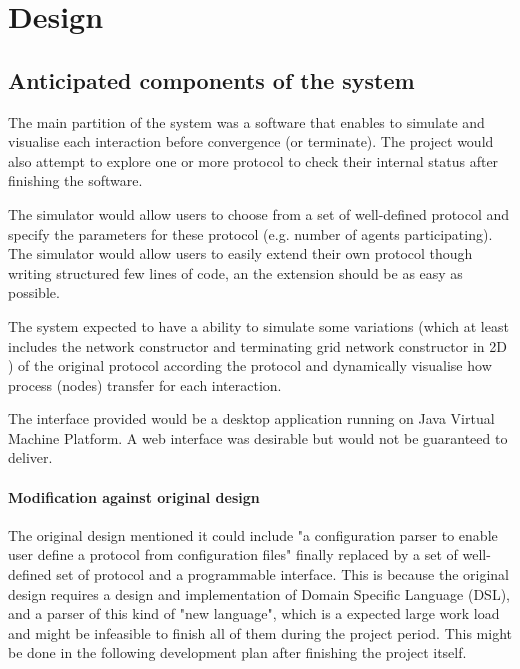 \section{Design} \label{design}
\subsection{Anticipated components of the system}
\par\noindent
The main partition of the system was a software that enables to simulate
and visualise each interaction before convergence (or terminate). The project
would also attempt to explore one or more protocol to check their internal
status after finishing the software.

\par\noindent
The simulator would allow users to choose from a set of well-defined protocol and
specify the parameters for these protocol (e.g. number of agents participating).
The simulator would allow users to easily extend their own protocol though writing
structured few lines of code, an the extension should be as easy as possible.

\par\noindent
The system expected to have a ability to simulate some variations (which at
least includes the network constructor \cite{MS16a} and terminating grid network constructor in 2D \cite{Mi17})
of the original protocol according the protocol and dynamically visualise how process (nodes) transfer for each interaction.

\par\noindent
The interface provided would be a desktop application running on Java Virtual Machine Platform.
A web interface was desirable but would not be guaranteed to deliver.

\paragraph{Modification against original design} The original design mentioned it could include "a configuration parser to
  enable user define a protocol from configuration files" finally replaced by a set of
  well-defined set of protocol and a programmable interface. This is because the
  original design requires a design and implementation of Domain Specific Language (DSL),
  and a parser of this kind of "new language", which is a expected large work load and might be
  infeasible to finish all of them
  during the project period. This might be done in the following development plan
  after finishing the project itself.

